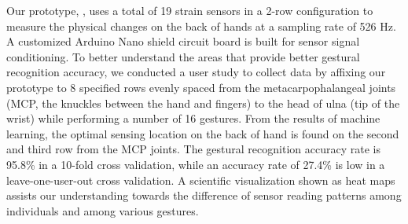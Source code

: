 \documentclass{sigchi}
\begin{document}


Our prototype, \getTitleName, uses a total of 19 strain sensors in a 2-row configuration to measure the physical changes on the back of hands at a sampling rate of 526 Hz. A customized Arduino Nano shield circuit board is built for sensor signal conditioning. To better understand the areas that provide better gestural recognition accuracy, we conducted a user study to collect data by affixing our prototype to 8 specified rows evenly spaced from the metacarpophalangeal joints (MCP, the knuckles between the hand and fingers) to the head of ulna (tip of the wrist) while performing a number of 16 gestures. From the results of machine learning, the optimal sensing location on the back of hand is found on the second and third row from the MCP joints. The gestural recognition accuracy rate is 95.8\% in a 10-fold cross validation, while an accuracy rate of 27.4\% is low in a leave-one-user-out cross validation. A scientific visualization shown as heat maps assists our understanding towards the difference of sensor reading patterns among individuals and among various gestures.

\end{document}

